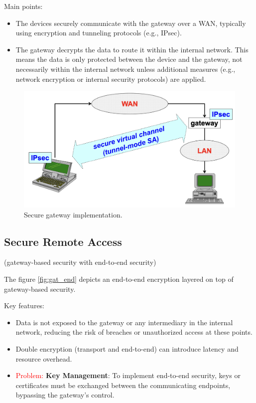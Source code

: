 Main points:
\begin{itemize}
    \item The devices securely communicate with the gateway over a WAN, typically using encryption and tunneling protocols (e.g., IPsec).
    \item The gateway decrypts the data to route it within the internal network. This means the data is only protected between the device and the gateway, not necessarily within the internal network unless additional measures (e.g., network encryption or internal security protocols) are applied.
\end{itemize}

\begin{figure}[H]
  \includegraphics[width=\linewidth]{Images/NetSec/secure_gateway.png}
  \caption{Secure gateway implementation.}
  \label{fig:secgat}
\end{figure}

\subsection{Secure Remote Access}
\begin{center}
    (gateway-based security with end-to-end security)
\end{center}

The figure \ref{fig:gat_end} depicts an end-to-end encryption layered on top of gateway-based security. 

Key features:
\begin{itemize}
    \item Data is not exposed to the gateway or any intermediary in the internal network, reducing the risk of breaches or unauthorized access at these points.
    \item Double encryption (transport and end-to-end) can introduce latency and resource overhead.
    \item \textcolor{red}{Problem: }\textbf{Key Management}: To implement end-to-end security, keys or certificates must be exchanged between the communicating endpoints, bypassing the gateway’s control.
\end{itemize}


